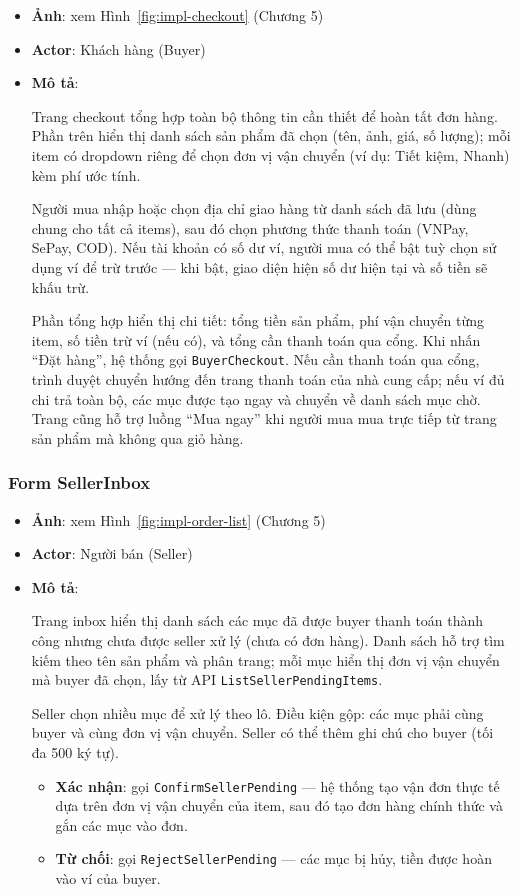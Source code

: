 \begin{itemize}[leftmargin=*]
  \item \textbf{Ảnh}: xem Hình~\ref{fig:impl-checkout} (Chương 5)
  \item \textbf{Actor}: Khách hàng (Buyer)
  \item \textbf{Mô tả}:

Trang checkout tổng hợp toàn bộ thông tin cần thiết để hoàn tất đơn hàng. Phần trên hiển thị danh sách sản phẩm đã chọn (tên, ảnh, giá, số lượng); mỗi item có dropdown riêng để chọn đơn vị vận chuyển (ví dụ: Tiết kiệm, Nhanh) kèm phí ước tính.

Người mua nhập hoặc chọn địa chỉ giao hàng từ danh sách đã lưu (dùng chung cho tất cả items), sau đó chọn phương thức thanh toán (VNPay, SePay, COD). Nếu tài khoản có số dư ví, người mua có thể bật tuỳ chọn sử dụng ví để trừ trước --- khi bật, giao diện hiện số dư hiện tại và số tiền sẽ khấu trừ.

Phần tổng hợp hiển thị chi tiết: tổng tiền sản phẩm, phí vận chuyển từng item, số tiền trừ ví (nếu có), và tổng cần thanh toán qua cổng. Khi nhấn ``Đặt hàng'', hệ thống gọi \texttt{BuyerCheckout}. Nếu cần thanh toán qua cổng, trình duyệt chuyển hướng đến trang thanh toán của nhà cung cấp; nếu ví đủ chi trả toàn bộ, các mục được tạo ngay và chuyển về danh sách mục chờ. Trang cũng hỗ trợ luồng ``Mua ngay'' khi người mua mua trực tiếp từ trang sản phẩm mà không qua giỏ hàng.
\end{itemize}

\subsubsection{Form SellerInbox}

\begin{itemize}[leftmargin=*]
  \item \textbf{Ảnh}: xem Hình~\ref{fig:impl-order-list} (Chương 5)
  \item \textbf{Actor}: Người bán (Seller)
  \item \textbf{Mô tả}:

Trang inbox hiển thị danh sách các mục đã được buyer thanh toán thành công nhưng chưa được seller xử lý (chưa có đơn hàng). Danh sách hỗ trợ tìm kiếm theo tên sản phẩm và phân trang; mỗi mục hiển thị đơn vị vận chuyển mà buyer đã chọn, lấy từ API \texttt{ListSellerPendingItems}.

Seller chọn nhiều mục để xử lý theo lô. Điều kiện gộp: các mục phải cùng buyer và cùng đơn vị vận chuyển. Seller có thể thêm ghi chú cho buyer (tối đa 500 ký tự).

    \begin{itemize}
      \item \textbf{Xác nhận}: gọi \texttt{ConfirmSellerPending} --- hệ thống tạo vận đơn thực tế dựa trên đơn vị vận chuyển của item, sau đó tạo đơn hàng chính thức và gắn các mục vào đơn.
      \item \textbf{Từ chối}: gọi \texttt{RejectSellerPending} --- các mục bị hủy, tiền được hoàn vào ví của buyer.
    \end{itemize}
\end{itemize}

